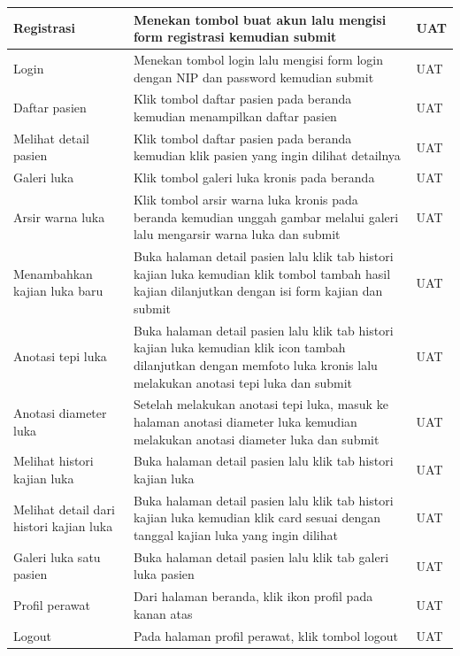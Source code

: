 \begin{enumerate}
\begin{longtable}[c]{@{} |p{4cm}|p{7cm}|p{2.3cm}| @{}}
 	\hline
 	\endfoot

 	\hline
 	\endlastfoot

 	\hline
 	
 	Registrasi & Menekan tombol buat akun lalu mengisi 
form registrasi kemudian submit & UAT\\
	\hline
	Login & Menekan tombol login lalu mengisi form login dengan NIP dan password kemudian submit & UAT\\
	\hline
	Daftar pasien & Klik tombol daftar pasien pada beranda kemudian menampilkan daftar pasien & UAT\\
	\hline
	Melihat detail pasien & Klik tombol daftar pasien pada beranda kemudian klik pasien yang ingin dilihat detailnya & UAT\\
	\hline
	Galeri luka & Klik tombol galeri luka kronis pada beranda & UAT\\
	\hline
	Arsir warna luka & Klik tombol arsir warna luka kronis pada beranda kemudian unggah gambar melalui galeri lalu mengarsir warna luka dan submit & UAT\\
	\hline
	Menambahkan kajian luka baru & Buka halaman detail pasien lalu klik tab histori kajian luka kemudian klik tombol tambah hasil kajian dilanjutkan dengan isi form kajian dan submit & UAT\\
	\hline
	Anotasi tepi luka & Buka halaman detail pasien lalu klik tab histori kajian luka kemudian klik icon tambah dilanjutkan dengan memfoto luka kronis lalu melakukan anotasi tepi luka dan submit & UAT\\
	\hline
	Anotasi diameter luka & Setelah melakukan anotasi tepi luka, masuk ke halaman anotasi diameter luka kemudian melakukan anotasi diameter luka dan submit & UAT\\
	\hline
	Melihat histori kajian luka & Buka halaman detail pasien lalu klik tab histori kajian luka & UAT\\
	\hline
	Melihat detail dari histori kajian luka & Buka halaman detail pasien lalu klik tab histori kajian luka kemudian klik card sesuai dengan tanggal kajian luka yang ingin dilihat & UAT\\
	\hline
	Galeri luka satu pasien & Buka halaman detail pasien lalu klik tab galeri luka pasien & UAT\\
	\hline
	Profil perawat & Dari halaman beranda, klik ikon profil pada kanan atas & UAT\\
	\hline
	Logout & Pada halaman profil perawat, klik tombol logout & UAT\\
	\hline
 	\end{longtable}
\end{enumerate}



